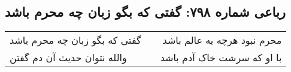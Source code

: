 \begin{center}
\section*{رباعی شماره ۷۹۸: گفتی که بگو زبان چه محرم باشد}
\label{sec:0798}
\begin{longtable}{l p{0.5cm} r}
گفتی که بگو زبان چه محرم باشد
&&
محرم نبود هرچه به عالم باشد
\\
والله نتوان حدیث آن دم گفتن
&&
با او که سرشت خاک آدم باشد
\\
\end{longtable}
\end{center}
